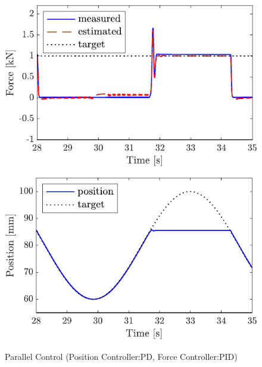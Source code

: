 \begin{figure}[t]
    \begin{minipage}{\minipageratio\hsize}
    \centering
        \includegraphics[keepaspectratio, scale = \minifigscale]{contents/IntegrationControl/figure/SECASQ/crop-FBsw_PID_force.pdf}
        \label{fig5:crop-FBsw_PID_force}
    \end{minipage}
    \begin{minipage}{\minipageratio\hsize}
    \centering
        \includegraphics[keepaspectratio, scale = \minifigscale]
        {contents/IntegrationControl/figure/SECASQ/crop-FBsw_PID_pos.pdf}
        \label{fig5:crop-FBsw_PID_pos}
    \end{minipage}
    \caption{Parallel Control (Position Controller:PD, Force Controller:PID)}   
    \label{fig5:crop-FBsw_PID}
\end{figure}

